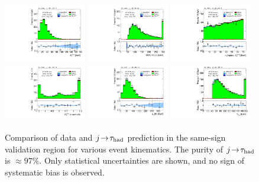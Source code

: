 \begin{figure}[tp]
  \includegraphics[width=0.32\textwidth]{figures/analysis/vbf-SSXCR/met-pt-hi}
  \includegraphics[width=0.32\textwidth]{figures/analysis/vbf-SSXCR/mMMC}
  \includegraphics[width=0.32\textwidth]{figures/analysis/vbf-SSXCR/mT} \\
  \includegraphics[width=0.32\textwidth]{figures/analysis/vbf-SSXCR/met-phi-centrality}
  \includegraphics[width=0.32\textwidth]{figures/analysis/vbf-SSXCR/H-pt-hi}
  \includegraphics[width=0.32\textwidth]{figures/analysis/vbf-SSXCR/mvis} \\
  \caption{Comparison of data and $j\!\rightarrow\!\tau_\text{had}$ prediction in the same-sign validation region for various event kinematics. The purity of $j\!\rightarrow\!\tau_\text{had}$ is $\approx\! 97\%$. Only statistical uncertainties are shown, and no sign of systematic bias is observed.}
  \label{fig:backgrounds-SSXCR-taus}
\end{figure}

